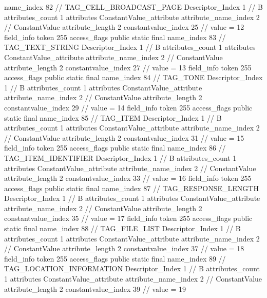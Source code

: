 {{{{{				name_index	82		// TAG_CELL_BROADCAST_PAGE
				Descriptor_Index	1		// B
				attributes_count	1
				attributes {
				ConstantValue_attribute {
					attribute_name_index	2		// ConstantValue
					attribute_length	2
					constantvalue_index	25		// value = 12
				}
				}
			}
			field_info {
				token	255
				access_flags	public static final
				name_index	83		// TAG_TEXT_STRING
				Descriptor_Index	1		// B
				attributes_count	1
				attributes {
				ConstantValue_attribute {
					attribute_name_index	2		// ConstantValue
					attribute_length	2
					constantvalue_index	27		// value = 13
				}
				}
			}
			field_info {
				token	255
				access_flags	public static final
				name_index	84		// TAG_TONE
				Descriptor_Index	1		// B
				attributes_count	1
				attributes {
				ConstantValue_attribute {
					attribute_name_index	2		// ConstantValue
					attribute_length	2
					constantvalue_index	29		// value = 14
				}
				}
			}
			field_info {
				token	255
				access_flags	public static final
				name_index	85		// TAG_ITEM
				Descriptor_Index	1		// B
				attributes_count	1
				attributes {
				ConstantValue_attribute {
					attribute_name_index	2		// ConstantValue
					attribute_length	2
					constantvalue_index	31		// value = 15
				}
				}
			}
			field_info {
				token	255
				access_flags	public static final
				name_index	86		// TAG_ITEM_IDENTIFIER
				Descriptor_Index	1		// B
				attributes_count	1
				attributes {
				ConstantValue_attribute {
					attribute_name_index	2		// ConstantValue
					attribute_length	2
					constantvalue_index	33		// value = 16
				}
				}
			}
			field_info {
				token	255
				access_flags	public static final
				name_index	87		// TAG_RESPONSE_LENGTH
				Descriptor_Index	1		// B
				attributes_count	1
				attributes {
				ConstantValue_attribute {
					attribute_name_index	2		// ConstantValue
					attribute_length	2
					constantvalue_index	35		// value = 17
				}
				}
			}
			field_info {
				token	255
				access_flags	public static final
				name_index	88		// TAG_FILE_LIST
				Descriptor_Index	1		// B
				attributes_count	1
				attributes {
				ConstantValue_attribute {
					attribute_name_index	2		// ConstantValue
					attribute_length	2
					constantvalue_index	37		// value = 18
				}
				}
			}
			field_info {
				token	255
				access_flags	public static final
				name_index	89		// TAG_LOCATION_INFORMATION
				Descriptor_Index	1		// B
				attributes_count	1
				attributes {
				ConstantValue_attribute {
					attribute_name_index	2		// ConstantValue
					attribute_length	2
					constantvalue_index	39		// value = 19
				}
}}}}}}
